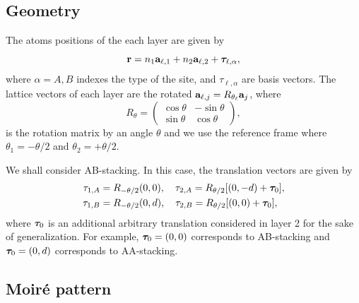 \subsection{Geometry}

The atoms positions of the each layer are given by
\begin{equation} \label{eq:position-atoms-tbg}
{\vb{r}} = n_1 {\vb{a}}_{\ell,1} + n_2 {\vb{a}}_{\ell,2} + {\bm{\tau}}_{\ell,\alpha},
\end{equation}
where $\alpha = A,B$ indexes the type of the site, and $\tau_{\ell,\alpha}$ are basis vectors. The lattice vectors of each layer are the rotated ${\vb{a}}_{\ell,j} = R_{\theta_\ell} {\vb{a}}_{j}$, where
\begin{equation} \label{eq:rotation-matrix}
R_\theta =
\begin{pmatrix}
\cos\theta & -\sin\theta \\
\sin\theta & \cos\theta
\end{pmatrix},
\end{equation}
is the rotation matrix by an angle $\theta$ and we use the reference frame where $\theta_1 = -\theta/2$ and $\theta_2 = +\theta/2$.

We shall consider AB-stacking. In this case, the translation vectors are given by
\begin{align}
\tau_{1,A} &= R_{-\theta/2}(0,0), \quad \tau_{2,A} = R_{\theta/2} [(0,-d) + {\bm{\tau}}_0], \label{eq:tauA} \\
\tau_{1,B} &= R_{-\theta/2}(0,d), \quad \tau_{2,B} = R_{\theta/2} [(0,0) + {\bm{\tau}}_0], \label{eq:tauB}
\end{align}
where ${\bm{\tau}}_0$ is an additional arbitrary translation considered in layer 2 for the sake of generalization. For example, ${\bm{\tau}}_0 = (0,0)$ corresponds to AB-stacking and ${\bm{\tau}}_0 = (0, d)$ corresponds to AA-stacking.

\subsection{Moiré pattern}

